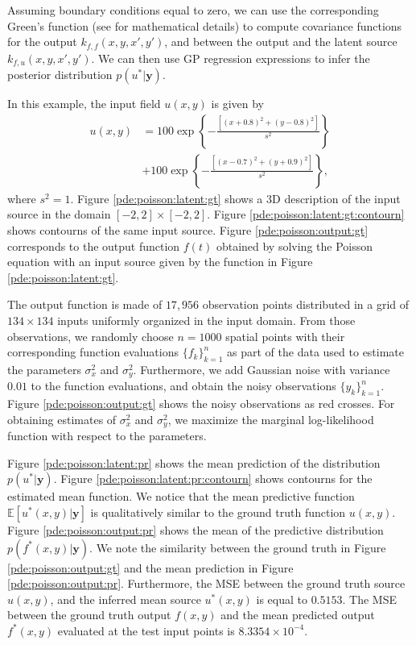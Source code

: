 \documentclass[journal]{IEEEtran}
\begin{document}
Assuming boundary conditions equal to zero, we can use the corresponding Green's function (see
\cite{Polyanin:Handbook02} for mathematical details) to compute covariance functions for the output
$k_{f,f}(x,y,x',y')$, and between the output and the latent source $k_{f,u}(x,y,x',y')$. We can then use GP regression
expressions to infer the posterior distribution $p(u^*|\mathbf{y})$.

In this example, the input field $u(x,y)$ is given by
\begin{align*}
u(x, y) & = 100\exp\left\{- \frac{\left[(x + 0.8)^2 + (y - 0.8)^2\right]}{s^2}\right\} \\
         & + 100\exp\left\{- \frac{\left[(x - 0.7)^2 + (y + 0.9)^2\right]}{s^2}\right\},
\end{align*}
where $s^2 = 1$.
Figure \ref{pde:poisson:latent:gt} shows a 3D description of the input source in the domain $[-2, 2]\times
[-2,2]$. Figure \ref{pde:poisson:latent:gt:contourn} shows contourns of the same input source. Figure
\ref{pde:poisson:output:gt} corresponds to the output function $f(t)$ obtained by solving the Poisson equation with an
input source given by the function in Figure \ref{pde:poisson:latent:gt}.



   The output function is made of $17,956$ observation points distributed in a grid of $134\times 134$ inputs uniformly
   organized in the input domain. From those observations, we randomly choose $n=1000$ spatial points with their
   corresponding function evaluations $\{f_k\}_{k=1}^n$ as part of the data used to estimate the parameters $\sigma_x^2$
   and $\sigma_y^2$. Furthermore, we add Gaussian noise with variance $0.01$ to the function evaluations, and obtain the
   noisy observations $\{y_k\}_{k=1}^n$. Figure \ref{pde:poisson:output:gt} shows the noisy observations as red crosses.
   For obtaining estimates of $\sigma_x^2$ and $\sigma_y^2$, we maximize the marginal log-likelihood function with
   respect to the parameters.

Figure \ref{pde:poisson:latent:pr} shows the mean prediction of the distribution $p(u^*|\mathbf{y})$. Figure
\ref{pde:poisson:latent:pr:contourn} shows contourns for the estimated mean function. We notice that the mean predictive
function $\mathbb{E}[u^*(x,y)|\mathbf{y}]$ is qualitatively similar to the ground truth function $u(x,y)$. Figure
\ref{pde:poisson:output:pr} shows the mean of the predictive distribution $p(f^*(x,y)|\mathbf{y})$. We note the
similarity between the ground truth in Figure \ref{pde:poisson:output:gt} and the mean prediction in Figure
\ref{pde:poisson:output:pr}.  Furthermore, the MSE between the ground truth source $u(x,y)$, and the inferred mean source $u^*(x,y)$
is equal to $0.5153$. The MSE between the ground truth output $f(x,y)$ and the mean predicted output $f^*(x,y)$
evaluated at the test input points is $8.3354\times 10^{-4}$.
\end{document}
